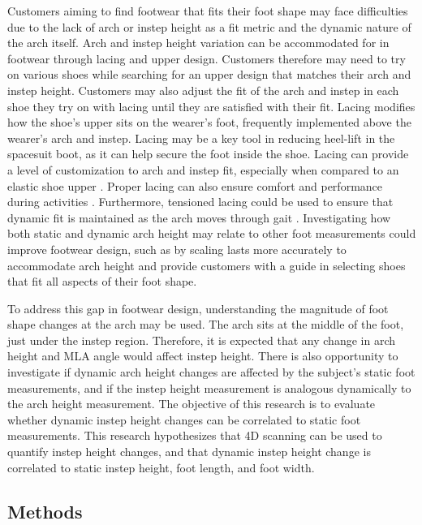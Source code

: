 \documentclass[defaultstyle,11pt]{thesis}
\begin{document}
Customers aiming to find footwear that fits their foot shape may face difficulties due to the lack of arch or instep height as a fit metric and the dynamic nature of the arch itself.
Arch and instep height variation can be accommodated for in footwear through lacing and upper design.
Customers therefore may need to try on various shoes while searching for an upper design that matches their arch and instep height.
Customers may also adjust the fit of the arch and instep in each shoe they try on with lacing until they are satisfied with their fit.
Lacing modifies how the shoe's upper sits on the wearer's foot, frequently implemented above the wearer's arch and instep.
Lacing may be a key tool in reducing heel-lift in the spacesuit boot, as it can help secure the foot inside the shoe.
Lacing can provide a level of customization to arch and instep fit, especially when compared to an elastic shoe upper \citep{Hong2011}.
Proper lacing can also ensure comfort and performance during activities \citep{Hagen2009, Hagen2010, Pryhoda2021}.
Furthermore, tensioned lacing could be used to ensure that dynamic fit is maintained as the arch moves through gait \citep{Pryhoda2021}.
Investigating how both static and dynamic arch height may relate to other foot measurements could improve footwear design, such as by scaling lasts more accurately to accommodate arch height and provide customers with a guide in selecting shoes that fit all aspects of their foot shape.

To address this gap in footwear design, understanding the magnitude of foot shape changes at the arch may be used.
The arch sits at the middle of the foot, just under the instep region.
Therefore, it is expected that any change in arch height and MLA angle would affect instep height.
There is also opportunity to investigate if dynamic arch height changes are affected by the subject's static foot measurements, and if the instep height measurement is analogous dynamically to the arch height measurement.
The objective of this research is to evaluate whether dynamic instep height changes can be correlated to static foot measurements.
This research hypothesizes that 4D scanning can be used to quantify instep height changes, and that dynamic instep height change is correlated to static instep height, foot length, and foot width.

\hypertarget{methods-2}{%
\subsection{Methods}\label{methods-2}}
\end{document}
